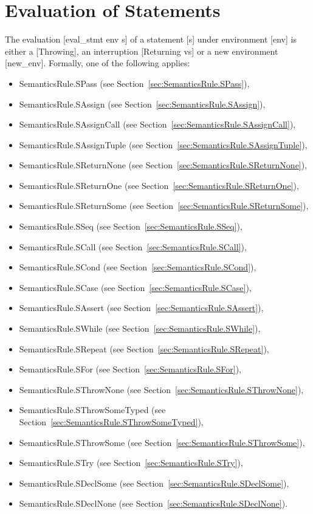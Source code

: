 \documentclass{book}
\begin{document}
\chapter{Evaluation of Statements \label{chap:eval_stmt}}
The evaluation [eval\_stmt env s] of a statement [s] under environment [env] is
either a [Throwing], an interruption [Returning vs] or a new environment
[new\_env]. Formally, one of the following applies:
\begin{itemize}
\item SemanticsRule.SPass (see Section~\ref{sec:SemanticsRule.SPass}), 
\item SemanticsRule.SAssign (see Section~\ref{sec:SemanticsRule.SAssign}), 
\item SemanticsRule.SAssignCall (see Section~\ref{sec:SemanticsRule.SAssignCall}), 
\item SemanticsRule.SAssignTuple (see Section~\ref{sec:SemanticsRule.SAssignTuple}), 
\item SemanticsRule.SReturnNone (see Section~\ref{sec:SemanticsRule.SReturnNone}), 
\item SemanticsRule.SReturnOne (see Section~\ref{sec:SemanticsRule.SReturnOne}), 
\item SemanticsRule.SReturnSome (see Section~\ref{sec:SemanticsRule.SReturnSome}), 
\item SemanticsRule.SSeq (see Section~\ref{sec:SemanticsRule.SSeq}), 
\item SemanticsRule.SCall (see Section~\ref{sec:SemanticsRule.SCall}), 
\item SemanticsRule.SCond (see Section~\ref{sec:SemanticsRule.SCond}), 
\item SemanticsRule.SCase (see Section~\ref{sec:SemanticsRule.SCase}), 
\item SemanticsRule.SAssert (see Section~\ref{sec:SemanticsRule.SAssert}), 
\item SemanticsRule.SWhile (see Section~\ref{sec:SemanticsRule.SWhile}), 
\item SemanticsRule.SRepeat (see Section~\ref{sec:SemanticsRule.SRepeat}), 
\item SemanticsRule.SFor (see Section~\ref{sec:SemanticsRule.SFor}), 
\item SemanticsRule.SThrowNone (see Section~\ref{sec:SemanticsRule.SThrowNone}), 
\item SemanticsRule.SThrowSomeTyped (see Section~\ref{sec:SemanticsRule.SThrowSomeTyped}), 
\item SemanticsRule.SThrowSome (see Section~\ref{sec:SemanticsRule.SThrowSome}), 
\item SemanticsRule.STry (see Section~\ref{sec:SemanticsRule.STry}), 
\item SemanticsRule.SDeclSome (see Section~\ref{sec:SemanticsRule.SDeclSome}), 
\item SemanticsRule.SDeclNone (see Section~\ref{sec:SemanticsRule.SDeclNone}). 
\end{itemize}
\end{document}
